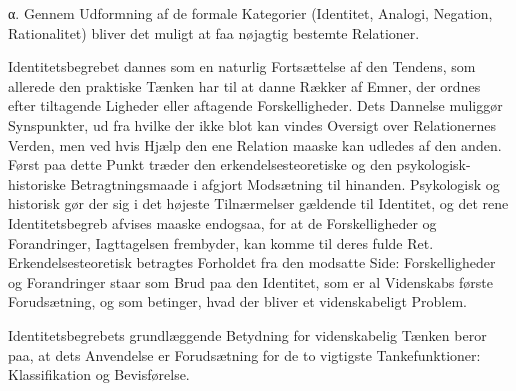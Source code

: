 \documentclass[12pt]{article}
\newcommand{\opage}[1]{\marginnote{\footnotesize\textit{[#1]}}}
\begin{document}
%
\label{sec:3b-alpha}%
α. Gennem Udformning af de formale Kategorier (Identitet,
Analogi, Negation, Rationalitet) bliver det muligt at
faa nøjagtig bestemte Relationer.

Identitetsbegrebet dannes som en naturlig Fortsættelse
af den Tendens, som allerede den praktiske Tænken har
til at danne Rækker af Emner, der ordnes efter tiltagende
Ligheder eller aftagende Forskelligheder. Dets Dannelse
\opage{34} muliggør Synspunkter, ud fra hvilke der ikke blot kan
vindes Oversigt over Relationernes Verden, men ved hvis
Hjælp den ene Relation maaske kan udledes af den anden.
Først paa dette Punkt træder den erkendelsesteoretiske og
den psykologisk-historiske Betragtningsmaade i afgjort Modsætning
til hinanden. Psykologisk og historisk gør der sig
i det højeste Tilnærmelser gældende til Identitet, og det
rene Identitetsbegreb afvises maaske endogsaa, for at de
Forskelligheder og Forandringer, Iagttagelsen frembyder,
kan komme til deres fulde Ret. Erkendelsesteoretisk betragtes
Forholdet fra den modsatte Side: Forskelligheder
og Forandringer staar som Brud paa den Identitet, som
er al Videnskabs første Forudsætning, og som betinger,
hvad der bliver et videnskabeligt Problem.

Identitetsbegrebets grundlæggende Betydning for videnskabelig
Tænken beror paa, at dets Anvendelse er Forudsætning
for de to vigtigste Tankefunktioner: Klassifikation
og Bevisførelse.
\end{document}
